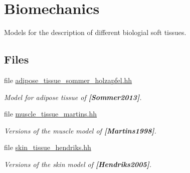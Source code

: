 \hypertarget{group__Biomechanics}{}\section{Biomechanics}
\label{group__Biomechanics}


Models for the description of different biologial soft tissues.  


\subsection*{Files}
\begin{DoxyCompactItemize}
\item 
file \hyperlink{adipose__tissue__sommer__holzapfel_8hh}{adipose\+\_\+tissue\+\_\+sommer\+\_\+holzapfel.\+hh}
\begin{DoxyCompactList}\small\item\em Model for adipose tissue of {\bfseries [Sommer2013]}. \end{DoxyCompactList}\item 
file \hyperlink{muscle__tissue__martins_8hh}{muscle\+\_\+tissue\+\_\+martins.\+hh}
\begin{DoxyCompactList}\small\item\em Versions of the muscle model of {\bfseries [Martins1998]}. \end{DoxyCompactList}\item 
file \hyperlink{skin__tissue__hendriks_8hh}{skin\+\_\+tissue\+\_\+hendriks.\+hh}
\begin{DoxyCompactList}\small\item\em Versions of the skin model of {\bfseries [Hendriks2005]}. \end{DoxyCompactList}\end{DoxyCompactItemize}
